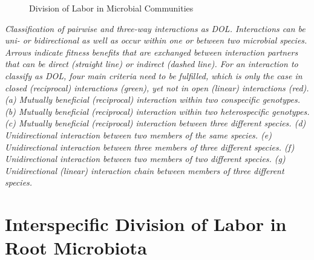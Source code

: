 \documentclass[
  11pt,
  a4paper,
]{report}
\begin{document}
\begin{figure}


\caption{\label{fig-microbial-dol}Division of Labor in Microbial
Communities}

\end{figure}%

\emph{Classification of pairwise and three-way interactions as DOL.
Interactions can be uni- or bidirectional as well as occur within one or
between two microbial species. Arrows indicate fitness benefits that are
exchanged between interaction partners that can be direct (straight
line) or indirect (dashed line). For an interaction to classify as DOL,
four main criteria need to be fulfilled, which is only the case in
closed (reciprocal) interactions (green), yet not in open (linear)
interactions (red). (a) Mutually beneficial (reciprocal) interaction
within two conspecific genotypes. (b) Mutually beneficial (reciprocal)
interaction within two heterospecific genotypes. (c) Mutually beneficial
(reciprocal) interaction between three different species. (d)
Unidirectional interaction between two members of the same species. (e)
Unidirectional interaction between three members of three different
species. (f) Unidirectional interaction between two members of two
different species. (g) Unidirectional (linear) interaction chain between
members of three different species.}

\section{Interspecific Division of Labor in Root
Microbiota}\label{interspecific-division-of-labor-in-root-microbiota}
\end{document}
